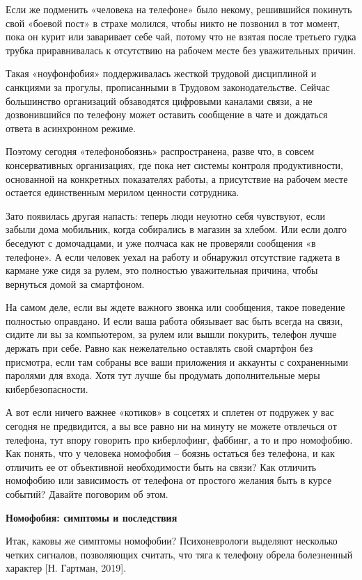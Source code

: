 Если же подменить «человека на телефоне» было некому, решившийся покинуть свой «боевой пост» в страхе молился, чтобы никто не позвонил в тот момент, пока он курит или заваривает себе чай, потому что не взятая после третьего гудка трубка приравнивалась к отсутствию на рабочем месте без уважительных причин.

Такая «ноуфонфобия» поддерживалась жесткой трудовой дисциплиной и санкциями за прогулы, прописанными в Трудовом законодательстве. Сейчас большинство организаций обзаводятся цифровыми каналами связи, а не дозвонившийся по телефону может оставить сообщение в чате и дождаться ответа в асинхронном режиме.

Поэтому сегодня «телефонобоязнь» распространена, разве что, в совсем консервативных организациях, где пока нет системы контроля продуктивности, основанной на конкретных показателях работы, а присутствие на рабочем месте остается единственным мерилом ценности сотрудника.

Зато появилась другая напасть: теперь люди неуютно себя чувствуют, если забыли дома мобильник, когда собирались в магазин за хлебом. Или если долго беседуют с домочадцами, и уже полчаса как не проверяли сообщения «в телефоне». А если человек уехал на работу и обнаружил отсутствие гаджета в кармане уже сидя за рулем, это полностью уважительная причина, чтобы вернуться домой за смартфоном.

На самом деле, если вы ждете важного звонка или сообщения, такое поведение полностью оправдано. И если ваша работа обязывает вас быть всегда на связи, сидите ли вы за компьютером, за рулем или вышли покурить, телефон лучше держать при себе. Равно как нежелательно оставлять свой смартфон без присмотра, если там собраны все ваши приложения и аккаунты с сохраненными паролями для входа. Хотя тут лучше бы продумать дополнительные меры кибербезопасности.

А вот если ничего важнее «котиков» в соцсетях и сплетен от подружек у вас сегодня не предвидится, а вы все равно ни на минуту не можете отвлечься от телефона, тут впору говорить про киберлофинг, фаббинг, а то и про номофобию. Как понять, что у человека номофобия – боязнь остаться без телефона, и как отличить ее от объективной необходимости быть на связи? Как отличить номофобию или зависимость от телефона от простого желания быть в курсе событий? Давайте поговорим об этом.


\textbf{Номофобия: симптомы и последствия}

Итак, каковы же симптомы номофобии? Психоневрологи выделяют несколько четких сигналов, позволяющих считать, что тяга к телефону обрела болезненный характер [Н. Гартман, 2019].

